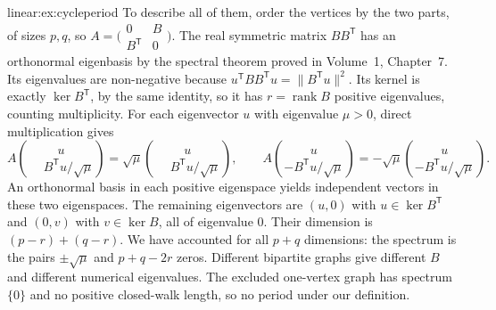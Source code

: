 \begin{solution}{linear:ex:cycleperiod}
To describe all of them, order the vertices by the two parts, of sizes $p,q$,
so $A=\bigl(\begin{smallmatrix}0&B\\B^{\mathsf T}&0\end{smallmatrix}\bigr)$.
The real symmetric matrix $BB^{\mathsf T}$ has an orthonormal eigenbasis by
the spectral theorem proved in Volume~1, Chapter~7. Its eigenvalues are
non-negative because $u^{\mathsf T}BB^{\mathsf T}u=\|B^{\mathsf T}u\|^2$.
Its kernel is exactly $\ker B^{\mathsf T}$, by the same identity, so it has
$r=\operatorname{rank}B$ positive eigenvalues, counting multiplicity.
For each eigenvector $u$ with eigenvalue $\mu>0$, direct multiplication gives
\[
A\binom{u}{\phantom{-}B^{\mathsf T}u/\sqrt\mu}
=\sqrt\mu\binom{u}{\phantom{-}B^{\mathsf T}u/\sqrt\mu},\qquad
A\binom{u}{-B^{\mathsf T}u/\sqrt\mu}
=-\sqrt\mu\binom{u}{-B^{\mathsf T}u/\sqrt\mu}.
\]
An orthonormal basis in each positive eigenspace yields independent vectors
in these two eigenspaces. The remaining eigenvectors are $(u,0)$ with
$u\in\ker B^{\mathsf T}$ and $(0,v)$ with $v\in\ker B$, all of eigenvalue $0$.
Their dimension is $(p-r)+(q-r)$. We have accounted for all $p+q$ dimensions:
the spectrum is the pairs $\pm\sqrt\mu$ and $p+q-2r$ zeros.
Different bipartite graphs give different $B$ and different numerical
eigenvalues. The excluded one-vertex graph has spectrum $\{0\}$ and no
positive closed-walk length, so no period under our definition.
\end{solution}

